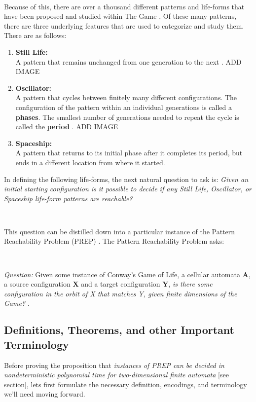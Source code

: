 \documentclass{article}
\theoremstyle{definition}
\theoremstyle{plain}
\theoremstyle{plain}
\begin{document}
\

Because of this, there are over a thousand different patterns and life-forms that have been proposed and studied within The Game \cite{Life_Wiki}. Of these many patterns, there are three underlying features that are used to categorize and study them. There are as follows: 

\begin{enumerate}
  \item \textbf{Still Life: } \\ A pattern that remains unchanged from one generation to the next \cite{JG2022conway}. ADD IMAGE
  \item \textbf{Oscillator: } \\ A pattern that cycles between finitely many different configurations. The configuration of the pattern within an individual generations is called a \textbf{phases}. The smallest number of generations needed to repeat the cycle is called the \textbf{period} \cite{JG2022conway}. ADD IMAGE
  \item \textbf{Spaceship: } \\ A pattern that returns to its initial phase after it completes its period, but ends in a different location from where it started. \cite{JG2022conway}
\end{enumerate}

In defining the following life-forms, the next natural question to ask is: \textit{Given an initial starting configuration is it possible to decide if any Still Life, Oscillator, or Spaceship life-form patterns are reachable?}

\

This question can be distilled down into a particular instance of the Pattern Reachability Problem (PREP) \cite{SUTNER199587}. The Pattern Reachability Problem asks: 

 \

 \textit{Question: } Given some instance of Conway's Game of Life, a cellular automata \textbf{A}, a source configuration \textbf{X} and a target configuration \textbf{Y}, \textit{is there some configuration in the orbit of X that matches Y, 
 given finite dimensions of the Game?} \cite{SUTNER199587}.

\subsection{Definitions, Theorems, and other Important Terminology}
Before proving the proposition that 
\textit {instances of PREP can be decided in nondeterministic polynomial time for two-dimensional finite automata} [see section], lets first formulate the necessary definition, encodings, and terminology we'll need moving forward.
\end{document}
